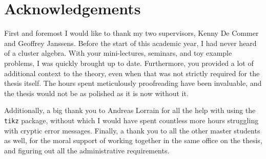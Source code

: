 \section*{Acknowledgements}

First and foremost I would like to thank my two supervisors, Kenny De Commer and
Geoffrey Janssens. Before the start of this academic year, I had never heard of a
cluster algebra. With your mini-lectures, seminars, and toy example problems, I was
quickly brought up to date. Furthermore, you provided a lot of additional context to
the theory, even when that was not strictly required for the thesis itself. The hours
spent meticulously proofreading have been invaluable, and the thesis would not be as
polished as it is now without it.

Additionally, a big thank you to Andreas Lorrain for all the help with using the
\texttt{tikz} package, without which I would have spent countless more hours struggling
with cryptic error messages. Finally, a thank you to all the other master students as
well, for the moral support of working together in the same office on the thesis, and
figuring out all the administrative requirements.
